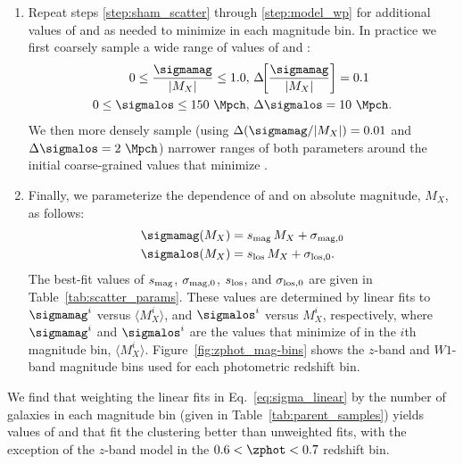 \documentclass[twocolumn,apj,iop,tighten]{emulateapj2}
\begin{document}
\begin{enumerate}[leftmargin=0pt, itemindent=24pt, listparindent=10pt, label=(\arabic*), nosep]
%
\item \label{step:model_refine}
Repeat steps \ref{step:sham_scatter} through \ref{step:model_wp} for additional values of \sigmamag and \sigmalos as needed to minimize \chisqred in each magnitude bin. In practice we first coarsely sample a wide range of values of \sigmamag and \sigmalos:
%
\begin{subequations}
  \begin{align}
    0 \leq \frac{\sigmamag}{|M_X|} \leq 1.0,\ & \Delta \!\! \left[\frac{\sigmamag}{|M_X|}\right]=0.1 \\
    0 \leq \sigmalos \leq 150~\Mpch,\ & \Delta \sigmalos=10~\Mpch.
  \end{align}
\end{subequations}
%
\noindent We then more densely sample (using $\Delta(\sigmamag/|M_X|)=0.01$ and ${\Delta \sigmalos=2~\Mpch}$) narrower ranges of both parameters around the initial coarse-grained values that minimize \chisqred.
%
\item \label{step:sigma_linear}
Finally, we parameterize the dependence of \sigmamag and \sigmalos on absolute magnitude, $M_X$, as follows:
%
\begin{subequations}\label{eq:sigma_linear}
\begin{align}
  \sigmamag(M_X) &= s_{\rm mag}\, M_X + \sigma_{{\rm mag},0} \\
  \sigmalos(M_X) &= s_{\rm los}\, M_X + \sigma_{{\rm los},0}.
\end{align}
\end{subequations}
%
\noindent The best-fit values of $s_{\rm mag}$, $\sigma_{{\rm mag},0}$, $s_{\rm los}$, and $\sigma_{{\rm los},0}$ are given in Table~\ref{tab:scatter_params}. These values are determined by linear fits to $\sigmamag^i$ versus $\langle M^i_X \rangle$, and $\sigmalos^i$ versus $M^i_X$, respectively, where $\sigmamag^i$ and $\sigmalos^i$ are the values that minimize \chisqred of \wprp in the $i$th magnitude bin, $\langle M^i_X \rangle$. Figure~\ref{fig:zphot_mag-bins} shows the $z$-band and $W1$-band magnitude bins used for each photometric redshift bin.
\end{enumerate}

We find that weighting the linear fits in Eq.~\ref{eq:sigma_linear} by the number of galaxies in each magnitude bin (given in Table~\ref{tab:parent_samples}) yields values of \sigmamag and \sigmalos that fit the clustering better than unweighted fits, with the exception of the $z$-band model in the $0.6<\zphot<0.7$ redshift bin.
\end{document}
